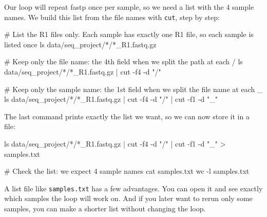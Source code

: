 \documentclass[
  letterpaper,
  DIV=11,
  numbers=noendperiod]{scrreprt}
\newenvironment{Shaded}{}{}
\newcommand{\AttributeTok}[1]{\textcolor[rgb]{0.84,0.23,0.29}{#1}}
\newcommand{\CommentTok}[1]{\textcolor[rgb]{0.42,0.45,0.49}{#1}}
\newcommand{\FunctionTok}[1]{\textcolor[rgb]{0.44,0.26,0.76}{#1}}
\newcommand{\KeywordTok}[1]{\textcolor[rgb]{0.84,0.23,0.29}{#1}}
\newcommand{\NormalTok}[1]{\textcolor[rgb]{0.14,0.16,0.18}{#1}}
\newcommand{\OperatorTok}[1]{\textcolor[rgb]{0.14,0.16,0.18}{#1}}
\newcommand{\PreprocessorTok}[1]{\textcolor[rgb]{0.84,0.23,0.29}{#1}}
\newcommand{\StringTok}[1]{\textcolor[rgb]{0.01,0.18,0.38}{#1}}
\begin{document}
Our loop will repeat fastp once per sample, so we need a list with the 4
sample names. We build this list from the file names with \texttt{cut},
step by step:

\begin{Shaded}
\begin{Highlighting}[]
\CommentTok{\# List the R1 files only. Each sample has exactly one R1 file, so each sample is listed once}
\FunctionTok{ls}\NormalTok{ data/seq\_project/}\PreprocessorTok{*}\NormalTok{/}\PreprocessorTok{*}\NormalTok{\_R1.fastq.gz}

\CommentTok{\# Keep only the file name: the 4th field when we split the path at each /}
\FunctionTok{ls}\NormalTok{ data/seq\_project/}\PreprocessorTok{*}\NormalTok{/}\PreprocessorTok{*}\NormalTok{\_R1.fastq.gz }\KeywordTok{|} \FunctionTok{cut} \AttributeTok{{-}f4} \AttributeTok{{-}d} \StringTok{"/"}

\CommentTok{\# Keep only the sample name: the 1st field when we split the file name at each \_}
\FunctionTok{ls}\NormalTok{ data/seq\_project/}\PreprocessorTok{*}\NormalTok{/}\PreprocessorTok{*}\NormalTok{\_R1.fastq.gz }\KeywordTok{|} \FunctionTok{cut} \AttributeTok{{-}f4} \AttributeTok{{-}d} \StringTok{"/"} \KeywordTok{|} \FunctionTok{cut} \AttributeTok{{-}f1} \AttributeTok{{-}d} \StringTok{"\_"}
\end{Highlighting}
\end{Shaded}

The last command prints exactly the list we want, so we can now store it
in a file:

\begin{Shaded}
\begin{Highlighting}[]
\FunctionTok{ls}\NormalTok{ data/seq\_project/}\PreprocessorTok{*}\NormalTok{/}\PreprocessorTok{*}\NormalTok{\_R1.fastq.gz }\KeywordTok{|} \FunctionTok{cut} \AttributeTok{{-}f4} \AttributeTok{{-}d} \StringTok{"/"} \KeywordTok{|} \FunctionTok{cut} \AttributeTok{{-}f1} \AttributeTok{{-}d} \StringTok{"\_"} \OperatorTok{\textgreater{}}\NormalTok{ samples.txt}

\CommentTok{\# Check the list: we expect 4 sample names}
\FunctionTok{cat}\NormalTok{ samples.txt}
\FunctionTok{wc} \AttributeTok{{-}l}\NormalTok{ samples.txt}
\end{Highlighting}
\end{Shaded}

A list file like \texttt{samples.txt} has a few advantages. You can open
it and see exactly which samples the loop will work on. And if you later
want to rerun only some samples, you can make a shorter list without
changing the loop.
\end{document}
